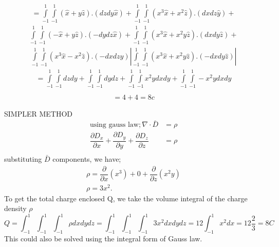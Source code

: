 \begin{exmp}
\begin{align*}
={\int\limits_{-1}^{1}\int\limits_{-1}^{1}}(\hat{x}+y\hat{z}).(dzdy\hat{x})+{\int\limits_{-1}^{1}\int\limits_{-1}^{1}}(x^3 \hat{x}+ x^2\hat{z}).(dxdz\hat{y})+
\end{align*}
\begin{align*}
{\int\limits_{-1}^{1}\int\limits_{-1}^{1}}( -\hat{x}+ y\hat{z}).(-dydz\hat{x})+
{\int\limits_{-1}^{1}\int\limits_{-1}^{1}}(x^3 \hat{x}+ x^2y\hat{z}).(dxdy \hat{z})+
\end{align*}
\begin{align*}
{\int\limits_{-1}^{1}\int\limits_{-1}^{1}}(x^3 \hat{x}- x^2\hat{z}).(-dxdz\hat{y})|
{\int\limits_{-1}^{1}\int\limits_{-1}^{1}}(x^3 \hat{x}+ x^2y\hat{z}).(-dxdy\hat{z})|
\end{align*}
\begin{align*}
={\int\limits_{-1}^{1}\int\limits_{-1}^{1}}dzdy + {\int\limits_{-1}^{1}\int\limits_{-1}^{1}}dydz +
{\int\limits_{-1}^{1}\int\limits_{-1}^{1}}x^2ydxdy +
{\int\limits_{-1}^{1}\int\limits_{-1}^{1}}-x^2ydxdy\\
\end{align*}
\begin{align*}
	=4+4 = 8c
\end{align*}




SIMPLER METHOD	 
\begin{align*}
\text{using gauss law}; \nabla\cdot\bar{D}&=\rho\\
\dfrac{\partial D_{x}}{\partial x}+\dfrac{\partial D_{y}}{\partial y}+\dfrac{\partial 
D_{z}}{\partial z}&=\rho \\
\end{align*}
substituting $\bar{D}$ components, we have;
\begin{align*}
\rho= \dfrac{\partial}{\partial x}(x^{3})+ 0 +\dfrac{\partial }{\partial z}(x^{2}y)\\
\rho=3x^{2} .
\end{align*}
To get the total charge enclosed Q, we take the volume integral of the charge density $\rho$
\begin{dmath*}
Q=\int_{-1}^{1}\int_{-1}^{1}\int_{-1}^{1}\rho dxdydz
=\int_{-1}^{1}\int_{-1}^{1}\int_{-1}^{1}3x^{2}dxdydz
=12\int_{-1}^{1}x^{2}dx= 12\frac{2}{3}
= 8 C
\end{dmath*}
This could also be solved using the integral form of Gauss law.
\end{exmp}

